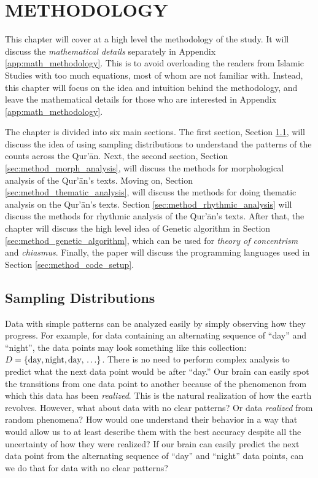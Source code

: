 \chapter{METHODOLOGY}\label{ch:methodology}
This chapter will cover at a high level the methodology of the study. It will discuss the \textit{mathematical details} separately in Appendix \ref{app:math_methodology}. This is to avoid overloading the readers from Islamic Studies with too much equations, most of whom are not familiar with. Instead, this chapter will focus on the idea and intuition behind the methodology, and leave the mathematical details for those who are interested in Appendix \ref{app:math_methodology}.

The chapter is divided into six main sections. The first section, Section \ref{sec:method_prob_distribution}, will discuss the idea of using sampling distributions to understand the patterns of the   counts across the Qur'\=an. Next, the second section, Section \ref{sec:method_morph_analysis}, will discuss the methods for morphological analysis of the Qur'\=an's texts. Moving on, Section \ref{sec:method_thematic_analysis}, will discuss the methods for doing thematic analysis on the Qur'\=an's texts. Section \ref{sec:method_rhythmic_analysis} will discuss the methods for rhythmic analysis of the Qur'\=an's texts. After that, the chapter will discuss the high level idea of Genetic algorithm in Section \ref{sec:method_genetic_algorithm}, which can be used for \textit{theory of concentrism} and \textit{chiasmus}. Finally, the paper will discuss the programming languages used in Section \ref{sec:method_code_setup}.
\section{Sampling Distributions}\label{sec:method_prob_distribution}
Data with simple patterns can be analyzed easily by simply observing how they progress. For example, for data containing an alternating sequence of ``day'' and ``night'', the data points may look something like this collection: $D=\{\text{day}, \text{night}, \text{day}, \newline\ldots\}$. There is no need to perform complex analysis to predict what the next data point would be after ``day.'' Our brain can easily spot the transitions from one data point to another because of the phenomenon from which this data has been \textit{realized}. This is the natural realization of how the earth revolves. However, what about data with no clear patterns? Or data \textit{realized} from random phenomena? How would one understand their behavior in a way that would allow us to at least describe them with the best accuracy despite all the uncertainty of how they were realized? If our brain can easily predict the next data point from the alternating sequence of ``day'' and ``night'' data points, can we do that for data with no clear patterns?

